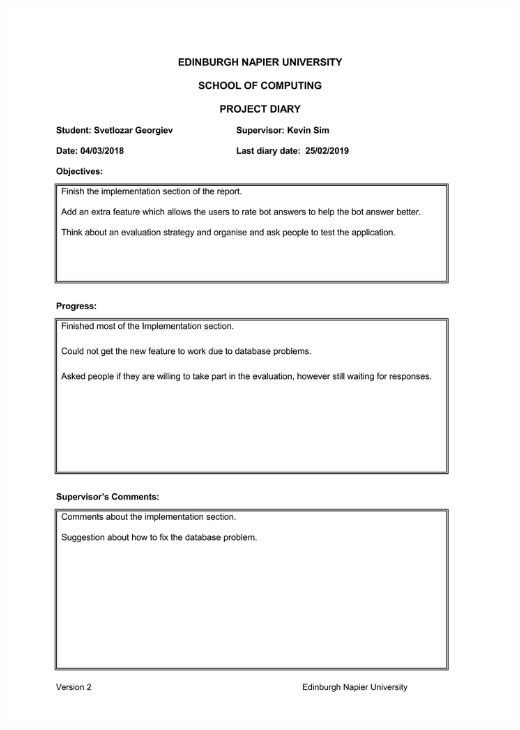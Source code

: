 \documentclass[12pt,a4paper]{article}
\begin{document}
\begin{appendices}
\includegraphics[width=\textwidth,height=\textheight,keepaspectratio]{s2week7.jpg}
\newpage

\end{appendices}
\end{document}
